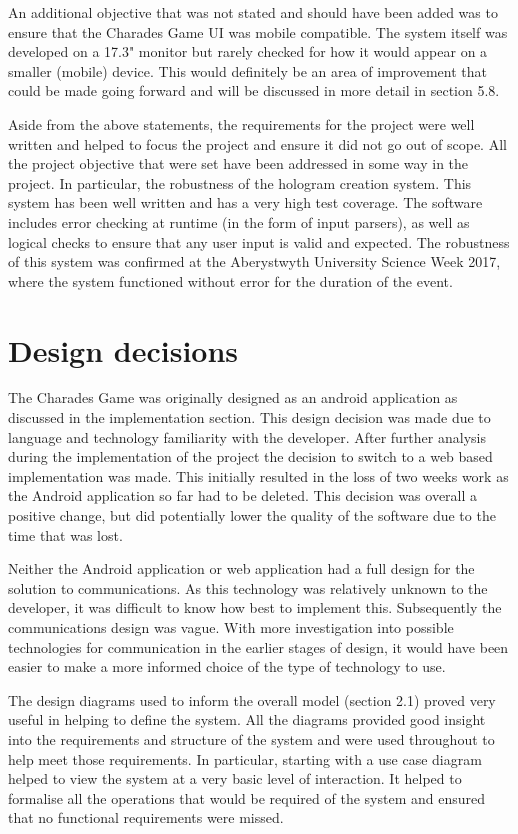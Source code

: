 An additional objective that was not stated and should have been added was to ensure that the Charades Game UI was mobile compatible. The system itself was developed on a 17.3" monitor but rarely checked for how it would appear on a smaller (mobile) device. This would definitely be an area of improvement that could be made going forward and will be discussed in more detail in section 5.8.

Aside from the above statements, the requirements for the project were well written and helped to focus the project and ensure it did not go out of scope. All the project objective that were set have been addressed in some way in the project. In particular, the robustness of the hologram creation system. This system has been well written and has a very high test coverage. The software includes error checking at runtime (in the form of input parsers), as well as logical checks to ensure that any user input is valid and expected. The robustness of this system was confirmed at the Aberystwyth University Science Week 2017, where the system functioned without error for the duration of the event.


\section{Design decisions}

The Charades Game was originally designed as an android application as discussed in the implementation section. This design decision was made due to language and technology familiarity with the developer. After further analysis during the implementation of the project the decision to switch to a web based implementation was made. This initially resulted in the loss of two weeks work as the Android application so far had to be deleted. This decision was overall a positive change, but did potentially lower the quality of the software due to the time that was lost.

Neither the Android application or web application had a full design for the solution to communications. As this technology was relatively unknown to the developer, it was difficult to know how best to implement this. Subsequently the communications design was vague. With more investigation into possible technologies for communication in the earlier stages of design, it would have been easier to make a more informed choice of the type of technology to use.

The design diagrams used to inform the overall model (section 2.1) proved very useful in helping to define the system. All the diagrams provided good insight into the requirements and structure of the system and were used throughout to help meet those requirements. In particular, starting with a use case diagram helped to view the system at a very basic level of interaction. It helped to formalise all the operations that would be required of the system and ensured that no functional requirements were missed.

